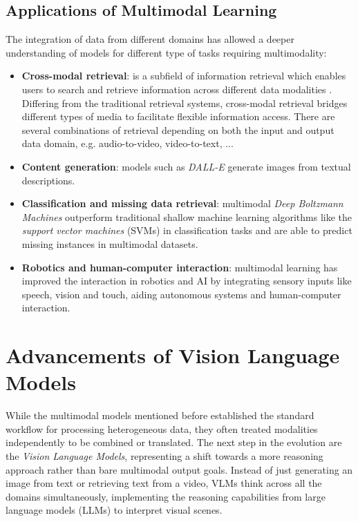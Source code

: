 \subsection{Applications of Multimodal Learning}
The integration of data from different domains has allowed a deeper understanding of models for different type of tasks requiring multimodality:

\begin{itemize}
	\item \textbf{Cross-modal retrieval}: is a subfield of information retrieval which enables users to search and retrieve information across different data modalities \cite{cross_modal_retrieval}. Differing from the traditional retrieval systems, cross-modal retrieval bridges different types of media to facilitate flexible information access. There are several combinations of retrieval depending on both the input and output data domain, e.g. audio-to-video, video-to-text, ...
	
	\item \textbf{Content generation}: models such as \textit{DALL-E} generate images from textual descriptions. 
	
	\item \textbf{Classification and missing data retrieval}: multimodal \textit{Deep Boltzmann Machines} outperform traditional shallow machine learning algorithms like the \textit{support vector machines} (SVMs) in classification tasks and are able to predict missing instances in multimodal datasets. 
	
	\item \textbf{Robotics and human-computer interaction}: multimodal learning has improved the interaction in robotics and AI by integrating sensory inputs like speech, vision and touch, aiding autonomous systems and human-computer interaction.
\end{itemize}

 
\section{Advancements of Vision Language Models}
While the multimodal models mentioned before established the standard workflow for processing heterogeneous data, they often treated modalities independently to be combined or translated. The next step in the evolution are the \textit{Vision Language Models}, representing a shift towards a more reasoning approach rather than bare multimodal output goals. Instead of just generating an image from text or retrieving text from a video, VLMs think across all the domains simultaneously, implementing the reasoning capabilities from large language models (LLMs) to interpret visual scenes. 

